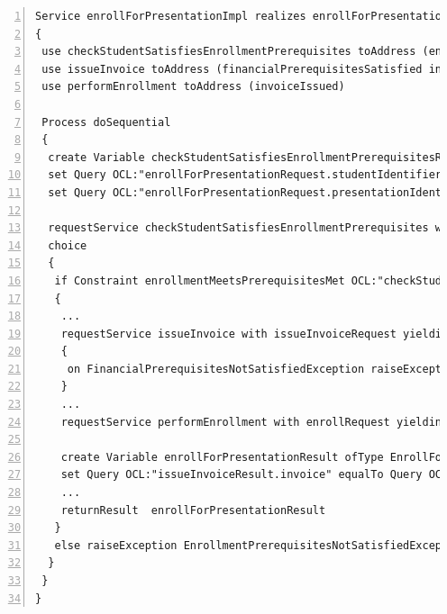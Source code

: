\lstset{language=urdad,caption=Specifying a service in the textual URDAD DSL syntax.,label=serviceTextSyntax}
\begin{lstlisting}[numbers=left,escapechar=|]
Service enrollForPresentationImpl realizes enrollForPresentation receiving Variable enrollForPresentationRequest ofType EnrollForPresentationRequest
{
 use checkStudentSatisfiesEnrollmentPrerequisites toAddress (enrollmentPrerequisitesMet)
 use issueInvoice toAddress (financialPrerequisitesSatisfied invoiceIssued) 
 use performEnrollment toAddress (invoiceIssued)
   
 Process doSequential
 {
  create Variable checkStudentSatisfiesEnrollmentPrerequisitesRequest ofType CheckStudentSatisfiesEnrollmentPrerequisitesRequest               
  set Query OCL:"enrollForPresentationRequest.studentIdentifier" equalTo Query OCL:"checkEnrollmentPrerequisitesRequest.studentIdentifier"
  set Query OCL:"enrollForPresentationRequest.presentationIdentifier" equalTo Query OCL:"checkEnrollmentPrerequisitesRequest.presentationIdentifier"
                     
  requestService checkStudentSatisfiesEnrollmentPrerequisites with checkStudentSatisfiesEnrollmentPrerequisitesRequest yielding Variable checkStudentSatisfiesEnrollmentPrerequisitesResult ofType CheckStudentSatisfiesEnrollmentPrerequisitesResult
  choice
  {
   if Constraint enrollmentMeetsPrerequisitesMet OCL:"checkStudentSatisfiesEnrollmentPrerequisitesResult.enrollmentPrerequisitesMet = true" doSequential
   {
    ...
    requestService issueInvoice with issueInvoiceRequest yielding Variable issueInvoiceResult ofType IssueInvoiceResult
    {
     on FinancialPrerequisitesNotSatisfiedException raiseException FinancialPrerequisitesNotSatisfiedException
    }
    ...
    requestService performEnrollment with enrollRequest yielding Variable performEnrollmentResult ofType PerformEnrollmentResult
          
    create Variable enrollForPresentationResult ofType EnrollForPresentationResult
    set Query OCL:"issueInvoiceResult.invoice" equalTo Query OCL:"enrollForPresentationResult.invoice"
    ...                       
    returnResult  enrollForPresentationResult
   }
   else raiseException EnrollmentPrerequisitesNotSatisfiedException
  }
 }
}                 
\end{lstlisting}

 
